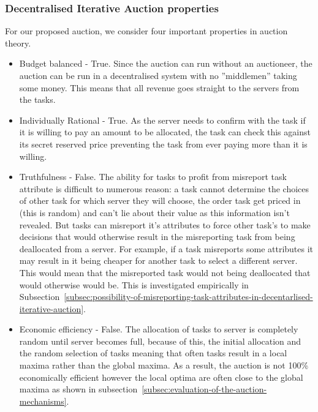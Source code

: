\subsubsection{Decentralised Iterative Auction properties}
\label{subsubsec:decentralised-iterative-auction-properties}
For our proposed auction, we consider four important properties in auction theory.
\begin{itemize}
    \item Budget balanced - True. Since the auction can run without an auctioneer, the auction can be run in a
        decentralised system with no ''middlemen'' taking some money. This means that all revenue goes straight to
        the servers from the tasks.
    \item Individually Rational - True. As the server needs to confirm with the task if it is willing to pay an amount
        to be allocated, the task can check this against its secret reserved price preventing the task from ever paying
        more than it is willing.
    \item Truthfulness - False. The ability for tasks to profit from misreport task attribute is difficult to
        numerous reason: a task cannot determine the choices of other task for which server they will choose, the
        order task get priced in (this is random) and can't lie about their value as this information isn't
        revealed. But tasks can misreport it's attributes to force other task's to make decisions that would otherwise
        result in the misreporting task from being deallocated from a server. For example, if a task misreports some
        attributes it may result in it being cheaper for another task to select a different server. This would mean
        that the misreported task would not being deallocated that would otherwise would be. This is investigated
        empirically in Subsection~\ref{subsec:possibility-of-misreporting-task-attributes-in-decentarlised-iterative-auction}.
    \item Economic efficiency - False. The allocation of tasks to server is completely random until server becomes full,
        because of this, the initial allocation and the random selection of tasks meaning that often tasks result in a
        local maxima rather than the global maxima. As a result, the auction is not 100\% economically efficient
        however the local optima are often close to the global maxima as shown in
        subsection~\ref{subsec:evaluation-of-the-auction-mechanisms}.
\end{itemize}

